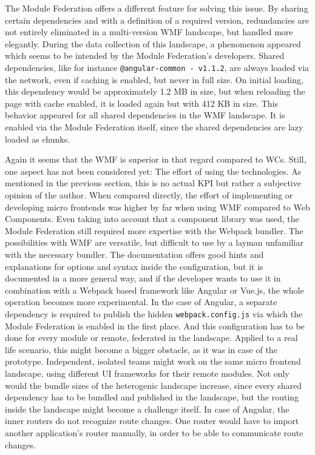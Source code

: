 The Module Federation offers a different feature for solving this issue. 
By sharing certain dependencies and with a definition of a required version, redundancies are not entirely eliminated in a multi-version WMF landscape, but handled more elegantly. 
During the data collection of this landscape, a phenomenon appeared which seems to be intended by the Module Federation's developers. 
Shared dependencies, like for instance \texttt{@angular-common - v1.1.2}, are always loaded via the network, even if caching is enabled, but never in full size. 
On initial loading, this dependency would be approximately 1.2 MB in size, but when reloading the page with cache enabled, it is loaded again but with 412 KB in size.
This behavior appeared for all shared dependencies in the WMF landscape. It is enabled via the Module Federation itself, since the shared dependencies are lazy loaded as chunks.\cite{wmf_the_good_and_ugly}

Again it seems that the WMF is superior in that regard compared to WCs. 
Still, one aspect has not been considered yet: The effort of using the technologies. 
As mentioned in the previous section, this is no actual KPI but rather a subjective opinion of the author. 
When compared directly, the effort of implementing or developing micro frontends was higher by far when using WMF compared to Web Components. 
Even taking into account that a component library was used, the Module Federation still required more expertise with the Webpack bundler.
The possibilities with WMF are versatile, but difficult to use by a layman unfamiliar with the necessary bundler. 
The documentation offers good hints and explanations for options and syntax inside the configuration, but it is documented in a more general way, and if the developer wants to use it in combination with a Webpack based framework like Angular or Vue.js, the whole operation becomes more experimental. 
In the case of Angular, a separate dependency is required to publish the hidden \texttt{webpack.config.js} via which the Module Federation is enabled in the first place. 
And this configuration has to be done for every module or remote, federated in the landscape. 
Applied to a real life scenario, this might become a bigger obstacle, as it was in case of the prototype.
Independent, isolated teams might work on the same micro frontend landscape, using different UI frameworks for their remote modules. 
Not only would the bundle sizes of the heterogenic landscape increase, since every shared dependency has to be bundled and published in the landscape, but the routing inside the landscape might become a challenge itself. 
In case of Angular, the inner routers do not recognize route changes. One router would have to import another application's router manually, in order to be able to communicate route changes.\cite{wmf_the_good_and_ugly}

